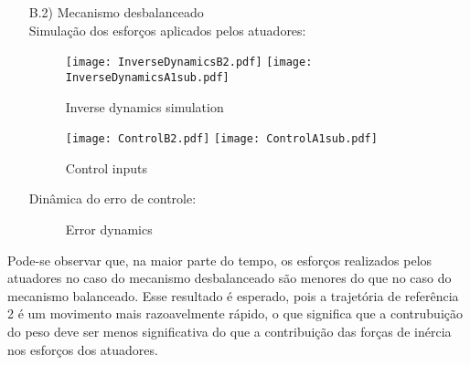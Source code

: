 \begin{itemize}
\begin{itemize}
\item[B.2)] Mecanismo desbalanceado \\

Simula\c{c}\~ao dos esfor\c{c}os aplicados pelos atuadores:

\begin{figure}[H]
\centering
\begin{minipage}[b]{0.45\linewidth}
\texttt{[image: InverseDynamicsB2.pdf]}
\texttt{[image: InverseDynamicsA1sub.pdf]}
\label{fig:InverseDynamicsB2}
\caption{Inverse dynamics simulation}
\end{minipage}
\quad
\begin{minipage}[b]{0.45\linewidth}
\texttt{[image: ControlB2.pdf]}
\texttt{[image: ControlA1sub.pdf]}
\label{fig:ControlB2}
\caption{Control inputs}
\end{minipage}
\end{figure}

Din\^amica do erro de controle:

\begin{figure}[H]
\centering
{}
\quad
{}
%
\caption{Error dynamics}
\label{fig:figure}
\end{figure}


\end{itemize}

Pode-se observar que, na maior parte do tempo, os esfor\c{c}os realizados pelos atuadores no caso do mecanismo desbalanceado s\~ao menores do que no caso do mecanismo balanceado. Esse resultado \'e esperado, pois a trajet\'oria de refer\^encia 2 \'e um movimento mais razoavelmente r\'apido, o que significa que a contrubui\c{c}\~ao do peso deve ser menos significativa do que a contribui\c{c}\~ao das for\c{c}as de in\'ercia nos esfor\c{c}os dos atuadores.

\end{itemize}